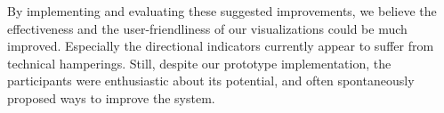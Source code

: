 By implementing and evaluating these suggested improvements, we believe the effectiveness and the user-friendliness of our visualizations could be much improved. Especially the directional indicators currently appear to suffer from technical hamperings. Still, despite our prototype implementation, the participants were enthusiastic about its potential, and often spontaneously proposed ways to improve the system.
